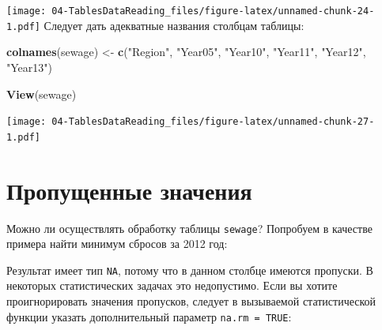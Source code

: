 \documentclass[]{book}
\newenvironment{Shaded}{\begin{snugshade}}{\end{snugshade}}
\newcommand{\KeywordTok}[1]{\textcolor[rgb]{0.13,0.29,0.53}{\textbf{#1}}}
\newcommand{\DataTypeTok}[1]{\textcolor[rgb]{0.13,0.29,0.53}{#1}}
\newcommand{\StringTok}[1]{\textcolor[rgb]{0.31,0.60,0.02}{#1}}
\newcommand{\OtherTok}[1]{\textcolor[rgb]{0.56,0.35,0.01}{#1}}
\newcommand{\OperatorTok}[1]{\textcolor[rgb]{0.81,0.36,0.00}{\textbf{#1}}}
\newcommand{\NormalTok}[1]{#1}
\begin{document}
\texttt{[image: 04-TablesDataReading\_files/figure-latex/unnamed-chunk-24-1.pdf]}
Следует дать адекватные названия столбцам таблицы:

\begin{Shaded}
\begin{Highlighting}[]
\KeywordTok{colnames}\NormalTok{(sewage) <-}\StringTok{ }\KeywordTok{c}\NormalTok{(}\StringTok{"Region"}\NormalTok{, }\StringTok{"Year05"}\NormalTok{, }\StringTok{"Year10"}\NormalTok{, }\StringTok{"Year11"}\NormalTok{, }\StringTok{"Year12"}\NormalTok{, }\StringTok{"Year13"}\NormalTok{)}
\end{Highlighting}
\end{Shaded}

\begin{Shaded}
\begin{Highlighting}[]
\KeywordTok{View}\NormalTok{(sewage)}
\end{Highlighting}
\end{Shaded}

\texttt{[image: 04-TablesDataReading\_files/figure-latex/unnamed-chunk-27-1.pdf]}

\section{Пропущенные значения}\label{missed_values}

Можно ли осуществлять обработку таблицы \texttt{sewage}? Попробуем в
качестве примера найти минимум сбросов за 2012 год:

\begin{Shaded}
\end{Shaded}

Результат имеет тип \texttt{NA}, потому что в данном столбце имеются
пропуски. В некоторых статистических задачах это недопустимо. Если вы
хотите проигнорировать значения пропусков, следует в вызываемой
статистической функции указать дополнительный параметр
\texttt{na.rm\ =\ TRUE}:

\begin{Shaded}
\end{Shaded}
\end{document}
